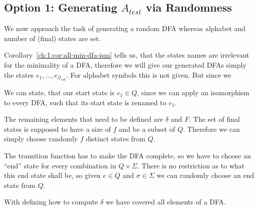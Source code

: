 \subsection{Option 1: Generating $A_{test}$ via Randomness}

We now approach the task of generating a random DFA whereas alphabet and number of (final) states are set.

Corollary~\ref{ch:1:cor:all-min-dfa-ism} tells us, that the states names are irrelevant for the minimality of a DFA, therefore we will give our generated DFAs simply the states $e_1, \ldots, e_{\mathcal{Q}_{sol}}$. For alphabet symbols this is not given. But since we 

We can state, that our start state is $e_1 \in Q$, since we can apply an isomorphism to every DFA, such that its start state is renamed to $e_1$.

The remaining elements that need to be defined are $\delta$ and $F$. The set of final states is supposed to have a size of $f$ and be a subset of $Q$. Therefore we can simply choose randomly $f$ distinct states from $Q$.

The transition function has to make the DFA complete, so we have to choose an ``end'' state for every combination in $Q \times \Sigma$. There is no restriction as to what this end state shall be, so given $e \in Q$ and $\sigma \in \Sigma$ we can randomly choose an end state from $Q$.

With defining how to compute $\delta$ we have covered all elements of a DFA.

